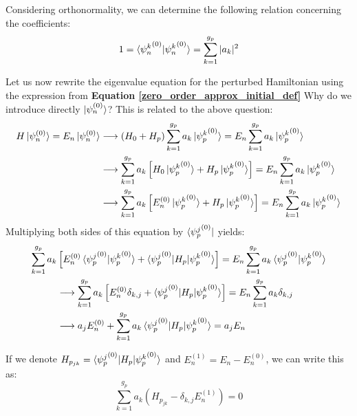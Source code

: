 Considering orthonormality, we can determine the following relation concerning the coefficients:
\begin{equation}
    1 = \braket{{\psi_n^k}^{(0)}|{\psi_n^k}^{(0)}} = \sum_{k=1}^{g_p} |a_k|^2
\end{equation}

Let us now rewrite the eigenvalue equation for the perturbed Hamiltonian using the expression from \textbf{Equation \ref{zero_order_approx_initial_def}} {\color{red}Why do we introduce directly $\ket{\psi_n^{(0)}}$? This is related to the above question}:
\begin{equation}
    \begin{split}
        H\ket{\psi_n^{(0)}} = E_n\ket{\psi_n^{(0)}} &\longrightarrow (H_0 + H_p)\sum_{k=1}^{g_p} a_k\ket{{\psi_p^k}^{(0)}} = E_n\sum_{k=1}^{g_p} a_k\ket{{\psi_p^k}^{(0)}} \\
        &\longrightarrow \sum_{k=1}^{g_p} a_k\left[H_0\ket{{\psi_p^k}^{(0)}} + H_p\ket{{\psi_p^k}^{(0)}}\right] = E_n\sum_{k=1}^{g_p} a_k\ket{{\psi_p^k}^{(0)}} \\ 
        &\longrightarrow \sum_{k=1}^{g_p} a_k\left[E_n^{(0)}\ket{{\psi_p^k}^{(0)}} + H_p\ket{{\psi_p^k}^{(0)}}\right] = E_n\sum_{k=1}^{g_p} a_k\ket{{\psi_p^k}^{(0)}} \\ 
    \end{split}
\end{equation}
Multiplying both sides of this equation by $\bra{{\psi_p^j}^{(0)}}$ yields:
\begin{equation}
    \begin{split}
        \sum_{k=1}^{g_p} a_k&\left[E_n^{(0)}\braket{{\psi_p^j}^{(0)}|{\psi_p^k}^{(0)}} + \braket{{\psi_p^j}^{(0)}|H_p|{\psi_p^k}^{(0)}}\right] = E_n\sum_{k=1}^{g_p} a_k\braket{{\psi_p^j}^{(0)}|{\psi_p^k}^{(0)}} \\ 
        &\longrightarrow \sum_{k=1}^{g_p} a_k\left[E_n^{(0)}\delta_{k,j} + \braket{{\psi_p^j}^{(0)}|H_p|{\psi_p^k}^{(0)}}\right] = E_n\sum_{k=1}^{g_p} a_k\delta_{k,j} \\ 
        &\longrightarrow a_jE_n^{(0)} + \sum_{k=1}^{g_p} a_k\braket{{\psi_p^j}^{(0)}|H_p|{\psi_p^k}^{(0)}} = a_j E_n \\ 
    \end{split}
\end{equation}

If we denote $H_{p_{jk}} = \braket{{\psi_p^j}^{(0)}|H_p|{\psi_p^k}^{(0)}}$ and $E_n^{(1)}=E_n - E_n^{(0)}$, we can write this as:
\begin{equation}
    \sum_{k=1}^{g_p} a_k\left(H_{p_{jk}}-\delta_{k,j} E_n^{(1)}\right) = 0
\end{equation}

